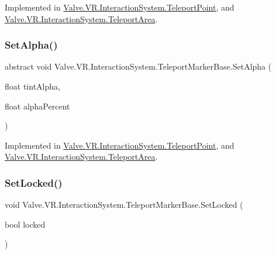 Implemented in \mbox{\hyperlink{class_valve_1_1_v_r_1_1_interaction_system_1_1_teleport_point_ad959cfb62361bc7b3b43d76a806d7bc7}{Valve.\+V\+R.\+Interaction\+System.\+Teleport\+Point}}, and \mbox{\hyperlink{class_valve_1_1_v_r_1_1_interaction_system_1_1_teleport_area_af6ccf32a483c32ef856b1f8a56bface5}{Valve.\+V\+R.\+Interaction\+System.\+Teleport\+Area}}.

\mbox{\label{class_valve_1_1_v_r_1_1_interaction_system_1_1_teleport_marker_base_a0f8f7a7f338cea092cbe1e9e1c12d4f2}} 
\subsubsection{\texorpdfstring{SetAlpha()}{SetAlpha()}}
{\footnotesize\ttfamily abstract void Valve.\+V\+R.\+Interaction\+System.\+Teleport\+Marker\+Base.\+Set\+Alpha (\begin{DoxyParamCaption}\item[{float}]{tint\+Alpha,  }\item[{float}]{alpha\+Percent }\end{DoxyParamCaption})\hspace{0.3cm}{\ttfamily [pure virtual]}}



Implemented in \mbox{\hyperlink{class_valve_1_1_v_r_1_1_interaction_system_1_1_teleport_point_a3ed605b7757540a5b6225716c18ee090}{Valve.\+V\+R.\+Interaction\+System.\+Teleport\+Point}}, and \mbox{\hyperlink{class_valve_1_1_v_r_1_1_interaction_system_1_1_teleport_area_ae510f0958167635ad57ebab1a16bdd38}{Valve.\+V\+R.\+Interaction\+System.\+Teleport\+Area}}.

\mbox{\label{class_valve_1_1_v_r_1_1_interaction_system_1_1_teleport_marker_base_a87c960b35fe852c32df75c7fda798c75}} 
\subsubsection{\texorpdfstring{SetLocked()}{SetLocked()}}
{\footnotesize\ttfamily void Valve.\+V\+R.\+Interaction\+System.\+Teleport\+Marker\+Base.\+Set\+Locked (\begin{DoxyParamCaption}\item[{bool}]{locked }\end{DoxyParamCaption})}



